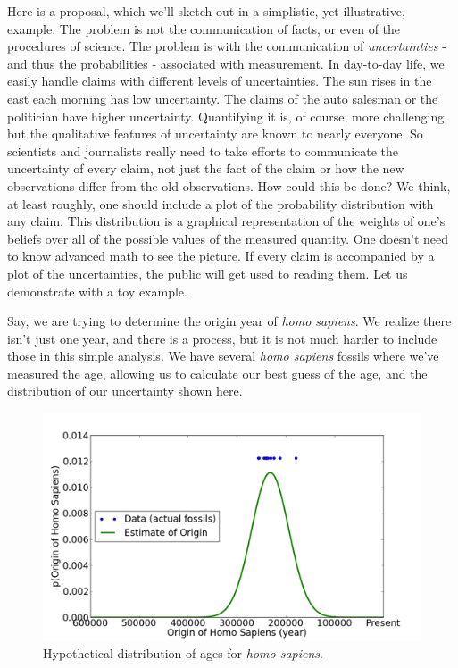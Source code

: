 Here is a proposal, which we'll sketch out in a simplistic, yet illustrative, example. The problem
is not the communication of facts, or even of the procedures of science.
The problem is with the communication of \emph{uncertainties} - and thus the probabilities - associated with measurement. In day-to-day life, we easily handle claims with different levels of
uncertainties. The sun rises in the east each morning has low
uncertainty. The claims of the auto salesman or the politician have
higher uncertainty. Quantifying it is, of course, more challenging but
the qualitative features of uncertainty are known to nearly everyone. So
scientists and journalists really need to take efforts to communicate
the uncertainty of every claim, not just the fact of the claim or how
the new observations differ from the old observations. How could this be
done?  We think, at least roughly, one should include a plot of the
probability distribution with any claim. This distribution is a graphical representation of the weights of one's beliefs over all of the possible values of the measured quantity.  One doesn't need to know
advanced math to see the picture. If every claim is accompanied by a
plot of the uncertainties, the public will get used to reading them. Let
us demonstrate with a toy example.

Say, we are trying to determine the origin year of {\em homo sapiens}. We realize there isn't just one year, and there is a process, but it is not much harder to include those in this simple analysis.  We have several {\em homo sapiens} fossils where we've measured the age, allowing us to
calculate our best guess of the age, and the distribution of our
uncertainty shown here.

\begin{figure}[htbp]
\centering
\includegraphics{img/blah2-2011-01-29-11-35.png}
\caption{Hypothetical distribution of ages for {\em homo sapiens}.}
\end{figure}

